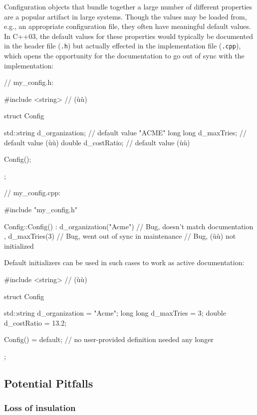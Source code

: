 Configuration objects that bundle together a large number of different
properties are a popular artifact in large systems. Though the values
may be loaded from, e.g., an appropriate configuration file, they often
have meaningful default values. In C++03, the default values for these
properties would typically be documented in the header file
(\lstinline!.h!) but actually effected in the implementation file
(\lstinline!.cpp!), which opens the opportunity for the documentation to go
out of sync with the implementation:

\begin{emcppslisting}
// my_config.h:

#include <string>  // (ù{}ù)

struct Config
{
   std::string d_organization;  // default value "ACME"
   long long   d_maxTries;      // default value (ù{}ù)
   double      d_costRatio;     // default value (ù{}ù)

   Config();
};

// my_config.cpp:

#include "my_config.h"

Config::Config()
    : d_organization("Acme")    // Bug, doesn't match documentation
    , d_maxTries(3)             // Bug, went out of sync in maintenance
{ }                             // Bug, (ù{}ù) not initialized
\end{emcppslisting}
    

Default initializers can be used in such cases to work as active
documentation:

\begin{emcppslisting}
#include <string>  // (ù{}ù)

struct Config
{
   std::string d_organization = "Acme";
   long long   d_maxTries     = 3;
   double      d_costRatio    = 13.2;

   Config() = default;  // no user-provided definition needed any longer
};
\end{emcppslisting}
    

\subsection[Potential Pitfalls]{Potential Pitfalls}\label{potential-pitfalls}

\subsubsection[Loss of insulation]{Loss of insulation}\label{loss-of-insulation}

